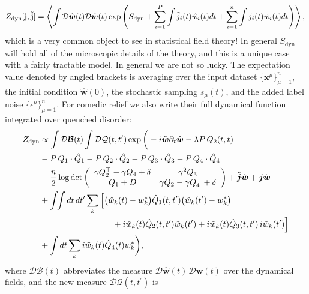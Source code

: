 \documentclass[11pt]{article}
\begin{document}
\begin{equation}
Z_{\operatorname{d y n}}[\mathbf{j}, \tilde{\mathbf{j}}]=\left\langle\int \mathcal{D}  \hat{\boldsymbol{w}}(t) \mathcal{D} {\tilde{\boldsymbol{w}}}(t) \exp{\left(S_{\operatorname{d y n}}+\sum_{i=1}^P \int \tilde{j}_i(t) \hat{w}_i(t) d t+\sum_{i=1}^n \int j_i(t) \tilde{w}_i(t) d t\right)}\right\rangle, \\
\end{equation}
which is a very common object to see in statistical field theory!  In general $S_\text{dyn}$ will hold all of the microscopic details of the theory, and this is a unique case with a fairly tractable model.  In general we are not so lucky. The expectation value denoted by angled brackets is averaging over the input dataset $\{\mathbf{x}^\mu\}_{\mu=1}^{n}$, the initial condition $\hat{\boldsymbol{w}}(0)$, the stochastic sampling  $s_{\mu}(t)$, and the added label noise $\{\epsilon^\mu\}_{\mu=1}^{n}$. For comedic relief we also write their full dynamical function integrated over quenched disorder:
\begin{equation}
\begin{aligned}
Z_{\operatorname{d y n}}& \propto \int \mathcal{D} \boldsymbol{\mathcal{B}}(t) \int \mathcal{D} \mathcal{Q}(t,t^{\prime}) \exp \bigg(- i \tilde{\boldsymbol{w}} \partial_t {\hat{\boldsymbol{w}}}- \lambda P\, Q_2(t,t) \\& -P\, Q_1\cdot \hat{Q}_1 -P\, Q_2 \cdot \hat{Q}_2-P\, Q_3\cdot \hat{Q}_3 -P\, Q_4\cdot \hat{Q}_4 \\& -\frac{n}{2}\log\operatorname{det}{\left(\begin{array}{cc}
\gamma Q_2^\top - \gamma Q_4+\delta &\gamma^2 Q_3 \\
Q_1+D& \gamma Q_2-\gamma Q_4^\top+\delta
\end{array}\right)}+\tilde{\boldsymbol{j}}  \hat{\boldsymbol{w}}+ \boldsymbol{j} \tilde{\boldsymbol{w}}\\
&+\int\!\!\int dt\, dt^{\prime} \sum_k\Big[\big( \hat{w}_k(t) - w^*_k \big) \hat{Q}_1(t,t^{\prime}) \big( \hat{w}_k(t^\prime) - w^*_k \big) \\
&\hspace{1.2in} +  i\hat{w}_k(t) \hat{Q}_2(t,t^{\prime})  \tilde{w}_k(t^\prime) + i\tilde{w}_k(t) \hat{Q}_3(t,t^{\prime})\, i\tilde{w}_k(t^\prime)\Big] \\
&+\int dt \sum_k i\tilde{w}_k(t)\hat{Q}_4(t)w^*_k\bigg),
\end{aligned}
\end{equation}
where $\mathcal{D} \boldsymbol{\mathcal{B}}(t)$ abbreviates the measure $\mathcal{D} \hat{\boldsymbol{w}}(t)\, \mathcal{D} \tilde{\boldsymbol{w}}(t)$ over the dynamical fields, and the new measure $\mathcal{D} \mathcal{Q}(t,t^{\prime})$ is
\end{document}
